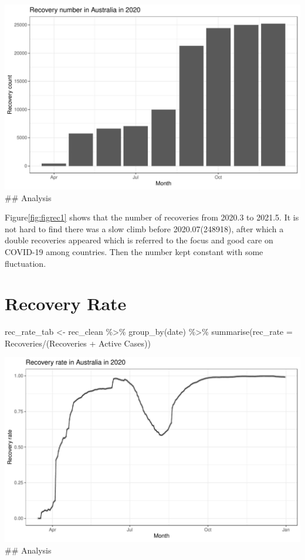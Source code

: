 \documentclass[11pt,a4paper,]{article}
\newenvironment{Shaded}{\begin{snugshade}}{\end{snugshade}}
\newcommand{\AttributeTok}[1]{\textcolor[rgb]{0.77,0.63,0.00}{#1}}
\newcommand{\FunctionTok}[1]{\textcolor[rgb]{0.00,0.00,0.00}{#1}}
\newcommand{\NormalTok}[1]{#1}
\newcommand{\OtherTok}[1]{\textcolor[rgb]{0.56,0.35,0.01}{#1}}
\newcommand{\SpecialCharTok}[1]{\textcolor[rgb]{0.00,0.00,0.00}{#1}}
\newcommand{\StringTok}[1]{\textcolor[rgb]{0.31,0.60,0.02}{#1}}
\begin{document}
\includegraphics{report_files/figure-latex/figrec1-1.pdf}
\#\# Analysis

Figure\ref{fig:figrec1} shows that the number of recoveries from 2020.3 to 2021.5. It is not hard to find there was a slow climb before 2020.07(248918), after which a double recoveries appeared which is referred to the focus and good care on COVID-19 among countries. Then the number kept constant with some fluctuation.

\hypertarget{recovery-rate}{%
\section{Recovery Rate}\label{recovery-rate}}

\begin{Shaded}
\begin{Highlighting}[]
\NormalTok{rec\_rate\_tab }\OtherTok{\textless{}{-}}\NormalTok{ rec\_clean }\SpecialCharTok{\%\textgreater{}\%} 
  \FunctionTok{group\_by}\NormalTok{(date) }\SpecialCharTok{\%\textgreater{}\%} 
  \FunctionTok{summarise}\NormalTok{(}\AttributeTok{rec\_rate =}\NormalTok{ Recoveries}\SpecialCharTok{/}\NormalTok{(Recoveries }\SpecialCharTok{+} \StringTok{\textasciigrave{}}\AttributeTok{Active Cases}\StringTok{\textasciigrave{}}\NormalTok{))}
\end{Highlighting}
\end{Shaded}

\includegraphics{report_files/figure-latex/figrec2-1.pdf}
\#\# Analysis
\end{document}
